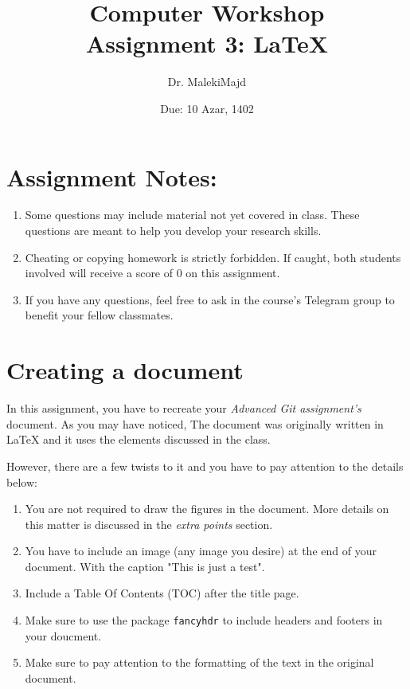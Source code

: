 \documentclass[titlepage]{article}
\title{Computer Workshop\\Assignment 3: {\LaTeX}}
\author{Dr. MalekiMajd}
\date{Due: 10 Azar, 1402}
\begin{document}
\maketitle

\section*{Assignment Notes:}
\begin{enumerate}
    \item Some questions may include material not yet covered in class. These questions are meant to help you develop your research skills.
    \item Cheating or copying homework is strictly forbidden. If caught, both students involved will receive a score of 0 on this assignment.
    \item If you have any questions, feel free to ask in the course's Telegram group to benefit your fellow classmates.
\end{enumerate}

\pagebreak

\section{Creating a document}
In this assignment, you have to recreate your \textit{Advanced Git assignment's} document. As you may have noticed,
The document was originally written in {\LaTeX} and it uses the elements discussed in the class.

However, there are a few twists to it and you have to pay attention to the details below:

\begin{enumerate}
    \item You are not required to draw the figures in the document. More details on this matter is discussed in the \textit{extra points} section.
    \item You have to include an image (any image you desire) at the end of your document. With the caption
        "This is just a test".
    \item Include a Table Of Contents (TOC) after the title page.
    \item Make sure to use the package \texttt{fancyhdr} to include headers and footers in your doucment.
    \item Make sure to pay attention to the formatting of the text in the original document.
\end{enumerate}
\end{document}
